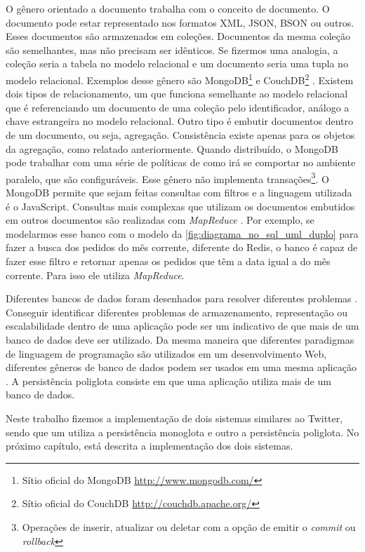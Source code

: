 O gênero orientado a documento trabalha com o conceito de documento. O documento pode estar representado nos formatos \ac{XML}, JSON, BSON ou outros. Esses documentos são armazenados em coleções. Documentos da mesma coleção são semelhantes, mas não precisam ser idênticos. Se fizermos uma analogia, a coleção seria a tabela no modelo relacional e um documento seria uma tupla no modelo relacional. Exemplos desse gênero são MongoDB\footnote{Sítio oficial do MongoDB \url{http://www.mongodb.com/}} e CouchDB\footnote{Sítio oficial do CouchDB \url{http://couchdb.apache.org/}} \cite{NoSQL}.
Existem dois tipos de relacionamento, um que funciona semelhante ao modelo relacional que é referenciando um documento de uma coleção pelo identificador, análogo a chave estrangeira no modelo relacional. Outro tipo é embutir documentos dentro de um documento, ou seja, agregação. Consistência existe apenas para os objetos da agregação, como relatado anteriormente. Quando distribuído, o MongoDB pode trabalhar com uma série de políticas de como irá se comportar no ambiente paralelo, que são configuráveis. Esse gênero não implementa transações\footnote{Operações de inserir, atualizar ou deletar com a opção de emitir o \textit{commit} ou \textit{rollback}}. O MongoDB permite que sejam feitas consultas com filtros e a linguagem utilizada é o JavaScript. Consultas mais complexas que utilizam os documentos embutidos em outros documentos são realizadas com \textit{MapReduce} \cite{NoSQL}. Por exemplo, se modelarmos esse banco com o modelo da \autoref{fig:diagrama_no_sql_uml_duplo} para fazer a busca dos pedidos do mês corrente, diferente do \ac{Redis}, o banco é capaz de fazer esse filtro e retornar apenas os pedidos que têm a data igual a do mês corrente. Para isso ele utiliza \textit{MapReduce}.

Diferentes bancos de dados foram desenhados para resolver diferentes problemas \cite{NoSQL}. Conseguir identificar diferentes problemas de armazenamento, representação ou escalabilidade dentro de uma aplicação pode ser um indicativo de que mais de um banco de dados deve ser utilizado. Da mesma maneira que diferentes paradigmas de linguagem de programação são utilizados em um desenvolvimento Web, diferentes gêneros de banco de dados podem ser usados em uma mesma aplicação \cite{multiparadigma}. A persistência poliglota consiste em que uma aplicação utiliza mais de um banco de dados.

Neste trabalho fizemos a implementação de dois sistemas similares ao Twitter, sendo que um utiliza a persistência monoglota e outro a persistência poliglota. No próximo capítulo, está descrita a implementação dos dois sistemas.


